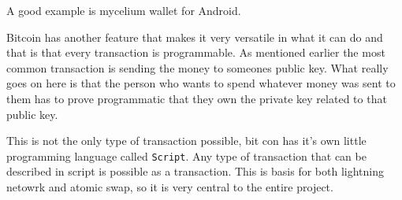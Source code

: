 A good example is mycelium wallet for Android.

Bitcoin has another feature that makes it very versatile in what it can do and that is that every transaction is programmable. As mentioned earlier the most common transaction is sending the money to someones public key. What really goes on here is that the person who wants to spend whatever money was sent to them has to prove programmatic that they own the private key related to that public key. 

This is not the only type of transaction possible, bit con has it's own little programming language called \texttt{Script}. Any type of transaction that can be described in script is possible as a transaction. This is basis for both lightning netowrk and atomic swap, so it is very central to the entire project. 
